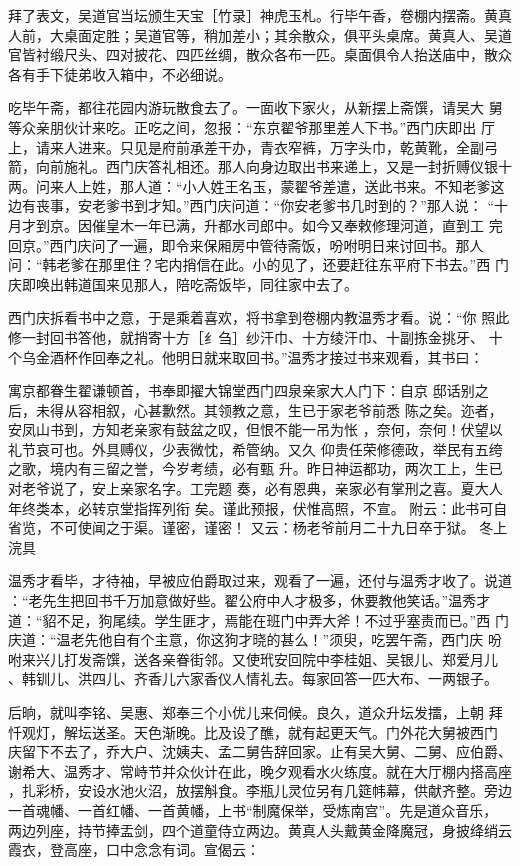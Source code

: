 拜了表文，吴道官当坛颁生天宝［竹录］神虎玉札。行毕午香，卷棚内摆斋。黄真
人前，大桌面定胜；吴道官等，稍加差小；其余散众，俱平头桌席。黄真人、吴道
官皆衬缎尺头、四对披花、四匹丝绸，散众各布一匹。桌面俱令人抬送庙中，散众
各有手下徒弟收入箱中，不必细说。

吃毕午斋，都往花园内游玩散食去了。一面收下家火，从新摆上斋馔，请吴大
舅等众亲朋伙计来吃。正吃之间，忽报：“东京翟爷那里差人下书。”西门庆即出
厅上，请来人进来。只见是府前承差干办，青衣窄裤，万字头巾，乾黄靴，全副弓
箭，向前施礼。西门庆答礼相还。那人向身边取出书来递上，又是一封折赙仪银十
两。问来人上姓，那人道：“小人姓王名玉，蒙翟爷差遣，送此书来。不知老爹这
边有丧事，安老爹书到才知。”西门庆问道：“你安老爹书几时到的？”那人说：
“十月才到京。因催皇木一年已满，升都水司郎中。如今又奉敕修理河道，直到工
完回京。”西门庆问了一遍，即令来保厢房中管待斋饭，吩咐明日来讨回书。那人
问：“韩老爹在那里住？宅内捎信在此。小的见了，还要赶往东平府下书去。”西
门庆即唤出韩道国来见那人，陪吃斋饭毕，同往家中去了。

西门庆拆看书中之意，于是乘着喜欢，将书拿到卷棚内教温秀才看。说：“你
照此修一封回书答他，就捎寄十方［纟刍］纱汗巾、十方绫汗巾、十副拣金挑牙、
十个乌金酒杯作回奉之礼。他明日就来取回书。”温秀才接过书来观看，其书曰：

寓京都眷生翟谦顿首，书奉即擢大锦堂西门四泉亲家大人门下：自京
邸话别之后，未得从容相叙，心甚歉然。其领教之意，生已于家老爷前悉
陈之矣。迩者，安凤山书到，方知老亲家有鼓盆之叹，但恨不能一吊为怅
，奈何，奈何！伏望以礼节哀可也。外具赙仪，少表微忱，希管纳。又久
仰贵任荣修德政，举民有五绔之歌，境内有三留之誉，今岁考绩，必有甄
升。昨日神运都功，两次工上，生已对老爷说了，安上亲家名字。工完题
奏，必有恩典，亲家必有掌刑之喜。夏大人年终类本，必转京堂指挥列衔
矣。谨此预报，伏惟高照，不宣。
附云：此书可自省览，不可使闻之于渠。谨密，谨密！
又云：杨老爷前月二十九日卒于狱。
冬上浣具

温秀才看毕，才待袖，早被应伯爵取过来，观看了一遍，还付与温秀才收了。说道
：“老先生把回书千万加意做好些。翟公府中人才极多，休要教他笑话。”温秀才
道：“貂不足，狗尾续。学生匪才，焉能在班门中弄大斧！不过乎塞责而已。”西
门庆道：“温老先他自有个主意，你这狗才晓的甚么！”须臾，吃罢午斋，西门庆
吩咐来兴儿打发斋馔，送各亲眷街邻。又使玳安回院中李桂姐、吴银儿、郑爱月儿
、韩钏儿、洪四儿、齐香儿六家香仪人情礼去。每家回答一匹大布、一两银子。

后晌，就叫李铭、吴惠、郑奉三个小优儿来伺候。良久，道众升坛发擂，上朝
拜忏观灯，解坛送圣。天色渐晚。比及设了醮，就有起更天气。门外花大舅被西门
庆留下不去了，乔大户、沈姨夫、孟二舅告辞回家。止有吴大舅、二舅、应伯爵、
谢希大、温秀才、常峙节并众伙计在此，晚夕观看水火练度。就在大厅棚内搭高座
，扎彩桥，安设水池火沼，放摆斛食。李瓶儿灵位另有几筵帏幕，供献齐整。旁边
一首魂幡、一首红幡、一首黄幡，上书“制魔保举，受炼南宫”。先是道众音乐，
两边列座，持节捧盂剑，四个道童侍立两边。黄真人头戴黄金降魔冠，身披绛绡云
霞衣，登高座，口中念念有词。宣偈云：

